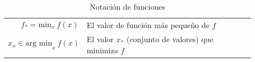 \begin{table}[H]
\begin{center}
\begin{tabularx}{\textwidth}{|r|X|}
            $ f_{*} = \text{min}_x~f(x) $                                                                                                                                                                                                     & El valor de función más pequeño de $f$                                                                \\
            $ {x}_x \in \text{arg min}_{x}~f(x) $                                                                                                                                                                                             & El valor $x_{*}$ (conjunto de valores) que minimiza $f$                                               \\
            \hline
        \end{tabularx}
        \caption{Notación de funciones}
        \label{tab:nnotation-part-functions}
    \end{center}
\end{table}



